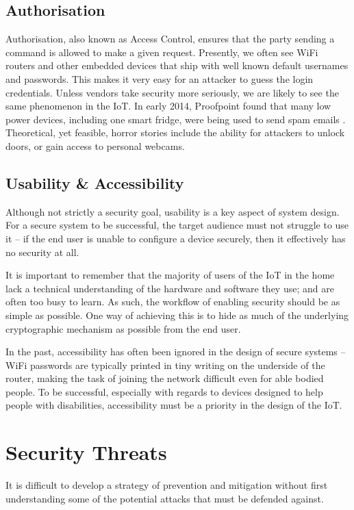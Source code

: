 \documentclass[10pt,journal,compsoc]{IEEEtran}
\begin{document}
\subsection{Authorisation}
Authorisation, also known as Access Control, ensures that the party sending a
command is allowed to make a given request. Presently, we often see WiFi
routers and other embedded devices that ship with well known default usernames
and passwords. This makes it very easy for an attacker to guess the login
credentials. Unless vendors take security more seriously, we are likely to see
the same phenomenon in the IoT. In early 2014, Proofpoint found that many low
power devices, including one smart fridge, were being used to send spam emails
\cite{Proofpoint2014}.  Theoretical, yet feasible, horror stories include the
ability for attackers to unlock doors, or gain access to personal webcams.  

\subsection{Usability \& Accessibility}
Although not strictly a security goal, usability is a key aspect of system
design. For a secure system to be successful, the target audience must not
struggle to use it -- if the end user is unable to configure a device securely,
then it effectively has no security at all.

It is important to remember that the majority of users of the IoT in the home
lack a technical understanding of the hardware and software they use; and are
often too busy to learn. As such, the workflow of enabling security should be
as simple as possible. One way of achieving this is to hide as much of the
underlying cryptographic mechanism as possible from the end user.

In the past, accessibility has often been ignored in the design of secure
systems -- WiFi passwords are typically printed in tiny writing on the
underside of the router, making the task of joining the network difficult even
for able bodied people. To be successful, especially with regards to devices
designed to help people with disabilities, accessibility must be a priority in
the design of the IoT.  


\section{Security Threats}
It is difficult to develop a strategy of prevention and mitigation without
first understanding some of the potential attacks that must be defended
against.  
\end{document}
